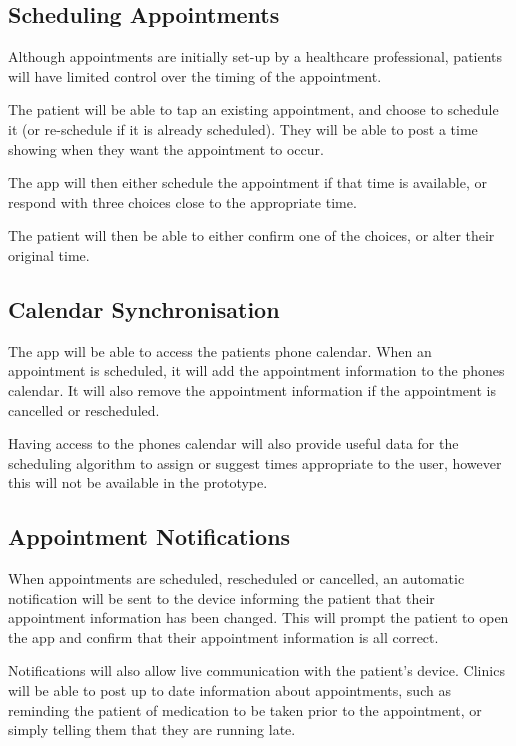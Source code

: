 \subsection{Scheduling Appointments}

Although appointments are initially set-up by a healthcare professional, patients will have limited control over the timing of the appointment. 

The patient will be able to tap an existing appointment, and choose to schedule it (or re-schedule if it is already scheduled). They will be able to post a time showing when they want the appointment to occur. 

The app will then either schedule the appointment if that time is available, or respond with three choices close to the appropriate time. 

The patient will then be able to either confirm one of the choices, or alter their original time.

\subsection{Calendar Synchronisation}

The app will be able to access the patients phone calendar. When an appointment is scheduled, it will add the appointment information to the phones calendar. It will also remove the appointment information if the appointment is cancelled or rescheduled.

Having access to the phones calendar will also provide useful data for the scheduling algorithm to assign or suggest times appropriate to the user, however this will not be available in the prototype.

\subsection{Appointment Notifications}

When appointments are scheduled, rescheduled or cancelled, an automatic notification will be sent to the device informing the patient that their appointment information has been changed. This will prompt the patient to open the app and confirm that their appointment information is all correct.

Notifications will also allow live communication with the patient's device. Clinics will be able to post up to date information about appointments, such as reminding the patient of medication to be taken prior to the appointment, or simply telling them that they are running late.

